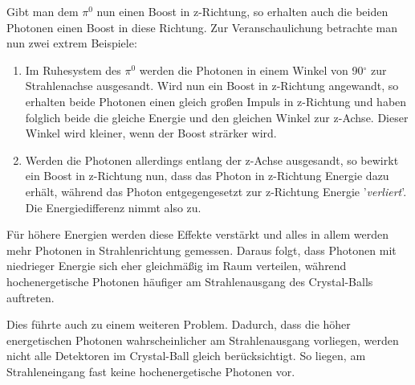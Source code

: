 \documentclass[a4paper,11pt,oneside,final,german,openbib,pdftex]{scrbook}
\begin{document}
{Gibt man dem $\pi^0$ nun einen Boost in z-Richtung, so erhalten auch die beiden Photonen einen Boost in diese Richtung.
Zur Veranschaulichung betrachte man nun zwei extrem Beispiele:

\begin{enumerate}
	\item Im Ruhesystem des $\pi^0$ werden die Photonen in einem Winkel von 90$^{\circ}$ zur Strahlenachse ausgesandt. Wird nun ein Boost in z-Richtung angewandt, so erhalten beide Photonen einen gleich gro{\ss}en Impuls in z-Richtung und haben folglich beide die gleiche Energie und den gleichen Winkel zur z-Achse. Dieser Winkel wird kleiner, wenn der Boost str\"arker wird.
	\item Werden die Photonen allerdings entlang der z-Achse ausgesandt, so bewirkt ein Boost in z-Richtung nun, dass das Photon in z-Richtung Energie dazu erh\"alt, w\"ahrend das Photon entgegengesetzt zur z-Richtung Energie '\textit{verliert}'. Die Energiedifferenz nimmt also zu.
\end{enumerate}

F\"ur h\"ohere Energien werden diese Effekte verst\"arkt und alles in allem werden mehr Photonen in Strahlenrichtung gemessen. Daraus folgt, dass Photonen mit niedrieger Energie sich eher gleichm\"a{\ss}ig im Raum verteilen, w\"ahrend hochenergetische Photonen h\"aufiger am Strahlenausgang des Crystal-Balls auftreten.

Dies f\"uhrte auch zu einem weiteren Problem. Dadurch, dass die h\"oher energetischen Photonen wahrscheinlicher am Strahlenausgang vorliegen, werden nicht alle Detektoren im Crystal-Ball gleich ber\"ucksichtigt. So liegen, am Strahleneingang fast keine hochenergetische Photonen vor.


}
\end{document}
